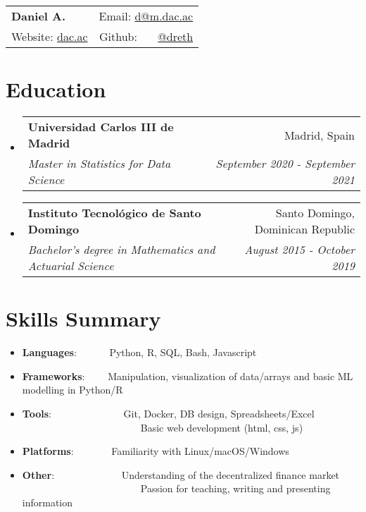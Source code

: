 \documentclass[a4paper,20pt]{article}
\makeatletter
\newcommand{\resumeItem}[2]{
  \item\small{
    \textbf{#1}{: #2 \vspace{-2pt}}
  }
}
\newcommand{\resumeSubheading}[4]{
  \vspace{-1pt}\item
    \begin{tabular*}{0.97\textwidth}{l@{\extracolsep{\fill}}r}
      \textbf{#1} & #2 \\
      \textit{#3} & \textit{#4} \\
    \end{tabular*}\vspace{-5pt}
}
\newcommand{\resumeSubItem}[2]{\resumeItem{#1}{#2}\vspace{-3pt}}
\newcommand{\resumeSubHeadingListStart}{\begin{itemize}[leftmargin=*]}
\newcommand{\resumeSubHeadingListEnd}{\end{itemize}}
\makeatother
\begin{document}
\begin{tabular*}{\textwidth}{l@{\extracolsep{\fill}}r}
  \textbf{{\LARGE Daniel A.}} & Email: \href{mailto:}{d@m.dac.ac}\\
  Website: \href{https://dac.ac}{dac.ac} & Github: ~~~\href{https://github.com/dreth}{@dreth}
\end{tabular*}




            
\vspace{-4pt}
\section{Education}
\resumeSubHeadingListStart
        
  \resumeSubheading
    {Universidad Carlos III de Madrid}{Madrid, Spain}
    {Master in Statistics for Data Science}{September 2020 - September 2021}
\vspace{-2pt}
  \resumeSubheading
    {Instituto Tecnológico de Santo Domingo}{Santo Domingo, Dominican Republic}
    {Bachelor's degree in Mathematics and Actuarial Science}{August 2015 - October 2019}
\resumeSubHeadingListEnd


            
\vspace{-7pt}
\section{Skills Summary}
  \resumeSubHeadingListStart
            
        
\vspace{-2pt}
\resumeSubItem{Languages}{~~~~~~Python, R, SQL, Bash, Javascript}
\vspace{-2pt}
\resumeSubItem{Frameworks}{~~~~Manipulation, visualization of data/arrays and basic ML modelling in Python/R}
\vspace{-2pt}
\resumeSubItem{Tools}{~~~~~~~~~~~~~~Git, Docker, DB design, Spreadsheets/Excel\\ ~~~~~~~~~~~~~~~~~~~~~~~~Basic web development (html, css, js)}
\vspace{-2pt}
\resumeSubItem{Platforms}{~~~~~~~Familiarity with Linux/macOS/Windows}
\vspace{-2pt}
\resumeSubItem{Other}{~~~~~~~~~~~~~Understanding of the decentralized finance market\\ ~~~~~~~~~~~~~~~~~~~~~~~~Passion for teaching, writing and presenting information}
\resumeSubHeadingListEnd
\end{document}
